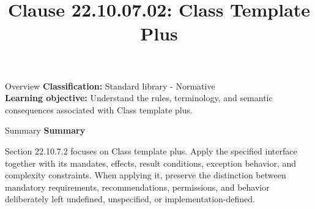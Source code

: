 \documentclass[10pt,letterpaper]{article}
\title{Clause 22.10.07.02: Class Template Plus}
\author{}
\date{}
\begin{document}
\maketitle
\begin{CornellOverviewBox}{Overview}
\textbf{Classification:} Standard library - Normative\\[2pt]
\textbf{Learning objective:} Understand the rules, terminology, and semantic consequences associated with Class template plus.
\end{CornellOverviewBox}\begin{CornellSummaryBox}{Summary}
{\sffamily\bfseries\color{Accent} Summary}\par\vspace{3pt}Section 22.10.7.2 focuses on Class template plus. Apply the specified interface together with its mandates, effects, result conditions, exception behavior, and complexity constraints. When applying it, preserve the distinction between mandatory requirements, recommendations, permissions, and behavior deliberately left undefined, unspecified, or implementation-defined.
\end{CornellSummaryBox}
\end{document}

